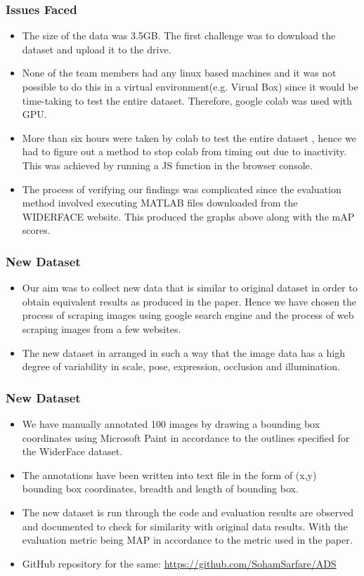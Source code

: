 \documentclass[11pt]{beamer}
\begin{document}
\begin{frame}
\frametitle{Issues Faced}
\begin{itemize}
\item The size of the data was 3.5GB. The first challenge was to download the dataset and upload it to the drive.
\item None of the team members had any linux based machines and it was not possible to do this in a virtual environment(e.g. Virual Box) since it would be time-taking to test the entire dataset. Therefore, google colab was used with GPU.
\item More than six hours were taken by colab to test the entire dataset , hence we had to figure out a method to stop colab from timing out due to inactivity. This was achieved by running a JS function in the browser console. 
\item The process of verifying our findings was complicated since the evaluation method involved executing MATLAB files downloaded from the WIDERFACE website. This produced the graphs above along with the mAP scores. 
\end{itemize}
\end{frame}
\begin{frame}
	\frametitle{New Dataset}
	\begin{itemize}
\item Our aim was to collect new data that is similar to original dataset in order to obtain equivalent results as produced in the paper. Hence we have chosen the process of scraping images using google search engine and the process of web scraping images from a few websites.
\item The new dataset in arranged in such a way that the image data has a high degree of variability in scale, pose, expression, occlusion and illumination.
	\end{itemize}
\end{frame} 
\begin{frame}
	\frametitle{New Dataset}
\begin{itemize}
\item We have manually annotated 100 images by drawing a bounding box coordinates using Microsoft Paint in accordance to the outlines specified for the WiderFace dataset. 
\item The annotations have been written into text file in the form of (x,y) bounding box coordinates, breadth and length of bounding box. 
\item The new dataset is run through the code and evaluation results are observed and documented to check for similarity with original data results. With the evaluation metric being MAP in accordance to the metric used in the paper. 
\item GitHub repository for the same: \url{https://github.com/SohamSarfare/ADS}
	\end{itemize}
\end{frame} 
\end{document}

